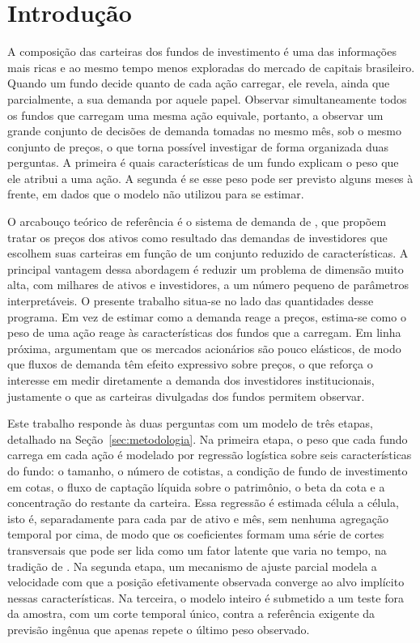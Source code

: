 \documentclass[12pt,a4paper]{article}
\begin{document}
\section{Introdução}
\label{sec:introducao}

A composição das carteiras dos fundos de investimento é uma das informações mais ricas e
ao mesmo tempo menos exploradas do mercado de capitais brasileiro. Quando um fundo decide
quanto de cada ação carregar, ele revela, ainda que parcialmente, a sua demanda por aquele
papel. Observar simultaneamente todos os fundos que carregam uma mesma ação equivale,
portanto, a observar um grande conjunto de decisões de demanda tomadas no mesmo mês, sob o
mesmo conjunto de preços, o que torna possível investigar de forma organizada duas
perguntas. A primeira é quais características de um fundo explicam o peso que ele atribui
a uma ação. A segunda é se esse peso pode ser previsto alguns meses à frente, em dados que
o modelo não utilizou para se estimar.

O arcabouço teórico de referência é o sistema de demanda de , que
propõem tratar os preços dos ativos como resultado das demandas de investidores que
escolhem suas carteiras em função de um conjunto reduzido de características. A principal
vantagem dessa abordagem é reduzir um problema de dimensão muito alta, com milhares de
ativos e investidores, a um número pequeno de parâmetros interpretáveis. O presente
trabalho situa-se no lado das quantidades desse programa. Em vez de estimar como a demanda
reage a preços, estima-se como o peso de uma ação reage às características dos fundos que a
carregam. Em linha próxima,  argumentam que os mercados acionários
são pouco elásticos, de modo que fluxos de demanda têm efeito expressivo sobre preços, o
que reforça o interesse em medir diretamente a demanda dos investidores institucionais,
justamente o que as carteiras divulgadas dos fundos permitem observar.

Este trabalho responde às duas perguntas com um modelo de três etapas, detalhado na
Seção~\ref{sec:metodologia}. Na primeira etapa, o peso que cada fundo carrega em cada ação
é modelado por regressão logística sobre seis características do fundo: o tamanho, o
número de cotistas, a condição de fundo de investimento em cotas, o fluxo de captação
líquida sobre o patrimônio, o beta da cota e a concentração do restante da carteira. Essa regressão é estimada célula a célula, isto é, separadamente para cada par de
ativo e mês, sem nenhuma agregação temporal por cima, de modo que os coeficientes formam
uma série de cortes transversais que pode ser lida como um fator latente que varia no
tempo, na tradição de . Na segunda etapa, um mecanismo de
ajuste parcial modela a velocidade com que a posição efetivamente observada converge ao
alvo implícito nessas características. Na terceira, o modelo inteiro é submetido a um
teste fora da amostra, com um corte temporal único, contra a referência exigente da
previsão ingênua que apenas repete o último peso observado.
\end{document}
